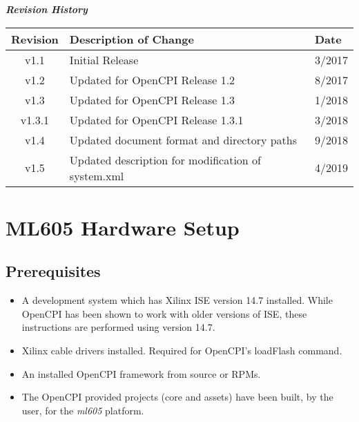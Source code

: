 \begin{center}
	\textit{\textbf{Revision History}}
	\begin{table}[H]
		\label{table:revisions} %
		\begin{tabularx}{\textwidth}{|c|X|l|}
			\hline
			\rowcolor{blue}
			\textbf{Revision} & \textbf{Description of Change} & \textbf{Date} \\
		    \hline
		    v1.1 & Initial Release & 3/2017 \\
		    \hline
		    v1.2 & Updated for OpenCPI Release 1.2 & 8/2017 \\
			\hline
			v1.3 & Updated for OpenCPI Release 1.3 & 1/2018 \\
			\hline
			v1.3.1 & Updated for OpenCPI Release 1.3.1 & 3/2018 \\
			\hline
			v1.4 & Updated document format and directory paths & 9/2018 \\
			\hline
			v1.5 & Updated description for modification of system.xml & 4/2019\\
			\hline
		\end{tabularx}
	\end{table}
\end{center}
\newpage

\tableofcontents
\newpage

\section{ML605 Hardware Setup}
\subsection{Prerequisites}
\begin{itemize}
	\item A development system which has Xilinx ISE version 14.7 installed. While OpenCPI has been shown to work with older versions of ISE, these instructions are performed using version 14.7.
	\item Xilinx cable drivers installed. Required for OpenCPI's loadFlash command.
	\item An installed OpenCPI framework from source or RPMs.
	\item The OpenCPI provided projects (core and assets) have been built, by the user, for the \textit{ml605} platform.
\end{itemize}

